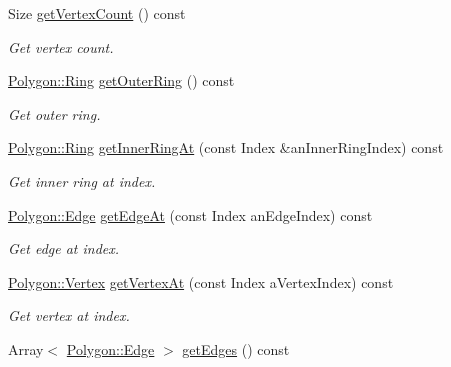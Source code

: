 \begin{DoxyCompactItemize}
Size \hyperlink{classostk_1_1math_1_1geom_1_1d2_1_1objects_1_1_polygon_ac53efcb8236507a884323d5db2dd5cdf}{get\+Vertex\+Count} () const
\begin{DoxyCompactList}\small\item\em Get vertex count. \end{DoxyCompactList}\item 
\hyperlink{classostk_1_1math_1_1geom_1_1d2_1_1objects_1_1_polygon_a2cfc117e0bd669946a670640eae4ee4c}{Polygon\+::\+Ring} \hyperlink{classostk_1_1math_1_1geom_1_1d2_1_1objects_1_1_polygon_a051e05d5e1a0e7e1a3e14fd7441ebbf0}{get\+Outer\+Ring} () const
\begin{DoxyCompactList}\small\item\em Get outer ring. \end{DoxyCompactList}\item 
\hyperlink{classostk_1_1math_1_1geom_1_1d2_1_1objects_1_1_polygon_a2cfc117e0bd669946a670640eae4ee4c}{Polygon\+::\+Ring} \hyperlink{classostk_1_1math_1_1geom_1_1d2_1_1objects_1_1_polygon_af1974ca25ea35ce4857dcac525f1180c}{get\+Inner\+Ring\+At} (const Index \&an\+Inner\+Ring\+Index) const
\begin{DoxyCompactList}\small\item\em Get inner ring at index. \end{DoxyCompactList}\item 
\hyperlink{classostk_1_1math_1_1geom_1_1d2_1_1objects_1_1_polygon_a85e5c92944c126a62464874b5a6ba490}{Polygon\+::\+Edge} \hyperlink{classostk_1_1math_1_1geom_1_1d2_1_1objects_1_1_polygon_a247cba455e33ab1a05c43de43c27ba48}{get\+Edge\+At} (const Index an\+Edge\+Index) const
\begin{DoxyCompactList}\small\item\em Get edge at index. \end{DoxyCompactList}\item 
\hyperlink{classostk_1_1math_1_1geom_1_1d2_1_1objects_1_1_polygon_a2fdf6254b42f087bd9cd0b8b0d7df91c}{Polygon\+::\+Vertex} \hyperlink{classostk_1_1math_1_1geom_1_1d2_1_1objects_1_1_polygon_af3eff08fe9f9c74c5d9aebe7fb5f888f}{get\+Vertex\+At} (const Index a\+Vertex\+Index) const
\begin{DoxyCompactList}\small\item\em Get vertex at index. \end{DoxyCompactList}\item 
Array$<$ \hyperlink{classostk_1_1math_1_1geom_1_1d2_1_1objects_1_1_polygon_a85e5c92944c126a62464874b5a6ba490}{Polygon\+::\+Edge} $>$ \hyperlink{classostk_1_1math_1_1geom_1_1d2_1_1objects_1_1_polygon_ac0c151b62ba0798eb4d86b2458e6d8b0}{get\+Edges} () const

\end{DoxyCompactItemize}
